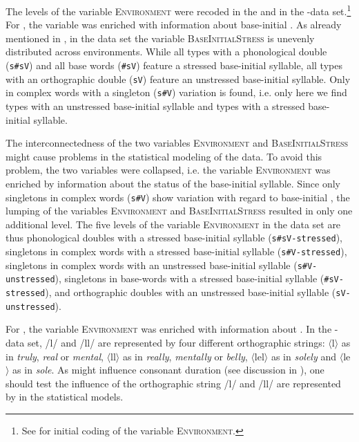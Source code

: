 The levels of the variable \textsc{Environment} were recoded in the  and in the -data set.\footnote{See  for initial coding of the variable \textsc{Environment.}} 
 For , the variable was enriched with information about base-initial . 
 As already mentioned in , in the data set the variable \textsc{BaseInitialStress} is unevenly distributed across environments.  While all types with a phonological double (\texttt{s\#sV}) and all base words (\texttt{\#sV}) feature a stressed base-initial syllable, all types with an orthographic double (\texttt{sV}) feature an unstressed base-initial syllable. Only in complex words with a singleton (\texttt{s\#V}) variation is found, i.e. only here we find types with an unstressed base-initial syllable and types with a stressed base-initial syllable. 
 
 The interconnectedness of the two variables \textsc{Environment} and \textsc{BaseInitialStress} might cause problems in  the statistical modeling of the data. To avoid this problem, the two variables were collapsed, i.e. the variable \textsc{Environment} was enriched by information about the  status of the base-initial syllable. Since only singletons in complex words (\texttt{s\#V}) show variation with regard to base-initial , the lumping of the variables \textsc{Environment} and \textsc{BaseInitialStress} resulted in only one additional level. 
 The five levels of the variable \textsc{Environment} in the data set are thus phonological doubles with a stressed base-initial syllable (\texttt{s\#sV-stressed}), singletons in complex words with a stressed base-initial syllable (\texttt{s\#V-stressed}), singletons in complex words with an unstressed base-initial syllable (\texttt{s\#V-unstressed}), singletons in base-words with a stressed base-initial syllable (\texttt{\#sV-stressed}), and orthographic doubles with an unstressed base-initial syllable (\texttt{sV-unstressed}).

 For , the variable \textsc{Environment} was enriched with information about . 
In the -data set, /l/ and /ll/ are represented by four different orthographic strings:  $\langle$l$\rangle$ as in \textit{truly},  \textit{real} or \textit{mental}, $\langle$ll$\rangle$ as in \textit{really}, \textit{mentally} or \textit{belly}, $\langle$lel$\rangle$ as in \textit{solely} and $\langle$le$\rangle$ as in \textit{sole}. As  might influence consonant duration (see discussion in ), one should test the influence of the orthographic string /l/ and /ll/ are represented by in the statistical models.






